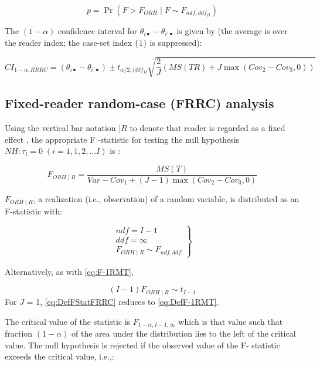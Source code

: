 \documentclass[
]{book}
\begin{document}
\begin{equation}
p=\Pr(F>F_{ORH} \mid F\sim F_{ndf,ddf_H})
\label{eq:pValueORHRRRC}
\end{equation}

The \((1-\alpha)\) confidence interval for \(\theta_{i \bullet} - \theta_{i' \bullet}\) is given by (the average is over the reader index; the case-set index \(\{1\}\) is suppressed):

\begin{equation}
CI_{1-\alpha,RRRC}=(\theta_{i \bullet} - \theta_{i' \bullet}) \pm t_{\alpha/2, (ddf_H}\sqrt{\frac{2}{J}(MS(TR)+J\max(Cov_2-Cov_3,0))}
\label{eq:CIalpha-RRRC}
\end{equation}

\hypertarget{fixed-reader-random-case-frrc-analysis}{%
\subsection{Fixed-reader random-case (FRRC) analysis}\label{fixed-reader-random-case-frrc-analysis}}

Using the vertical bar notation \(\mid R\) to denote that reader is regarded as a fixed effect \citep{RN1124}, the appropriate F -statistic for testing the null hypothesis \(NH: \tau_i = 0 \; (i=1,1,2,...I)\) is \citep{RN1865}:

\begin{equation}
F_{ORH \mid R}=\frac{MS(T)}{Var-Cov_1+(J-1)\max(Cov_2-Cov_3,0)}
\label{eq:DefFStatFRRC}
\end{equation}

\(F_{ORH \mid R}\), a realization (i.e., observation) of a random variable, is distributed as an F-statistic with:

\begin{equation}
\left.\begin{matrix}
ndf=I-1\\ 
ddf=\infty\\
F_{ORH \mid R} \sim F_{ndf,ddf}
\end{matrix}\right\}
\label{eq:FStatFRRC}
\end{equation}

Alternatively, as with \eqref{eq:F-1RMT},

\[(I-1)F_{ORH \mid R} \sim t_{I-1}\]
For \(J\) = 1, \eqref{eq:DefFStatFRRC} reduces to \eqref{eq:DefF-1RMT}.

The critical value of the statistic is \(F_{1-\alpha,I-1,\infty}\) which is that value such that fraction \((1-\alpha)\) of the area under the distribution lies to the left of the critical value. The null hypothesis is rejected if the observed value of the F- statistic exceeds the critical value, i.e.,:
\end{document}
